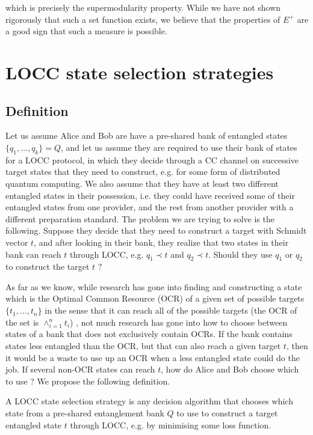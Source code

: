 \noindent which is precisely the supermodularity property. While we have not shown rigorously that such a set function exists, we believe that the properties of $E^+$ are a good sign that such a measure is possible.



\section{LOCC state selection strategies} \label{sec:strategies}

\subsection{Definition}

Let us assume Alice and Bob are have a pre-shared bank of entangled states $\{q_1, \dots, q_k\} = Q$, and let us assume they are required to use their bank of states for a LOCC protocol, in which they decide through a CC channel on successive target states that they need to construct, e.g. for some form of distributed quantum computing. We also assume that they have at least two different entangled states in their possession, i.e. they could have received some of their entangled states from one provider, and the rest from another provider with a different preparation standard. The problem we are trying to solve is the following. Suppose they decide that they need to construct a target with Schmidt vector $t$, and after looking in their bank, they realize that two states in their bank can reach $t$ through LOCC, e.g. $q_1 \prec t$ and $q_2 \prec t$. Should they use $q_1$ or $q_2$ to construct the target $t$ ?

As far as we know, while research has gone into finding and constructing a state which is the Optimal Common Resource (OCR) of a given set of possible targets $\{t_1, \dots, t_n\}$ in the sense that it can reach all of the possible targets (the OCR of the set is $\wedge_{i=1}^n t_i$) \cite{bosyk_optimal_2019, deside_probabilistic_2024}, not much research has gone into how to choose between states of a bank that does not exclusively contain OCRs. If the bank contains states less entangled than the OCR, but that can also reach a given target $t$, then it would be a waste to use up an OCR when a less entangled state could do the job. If several non-OCR states can reach $t$, how do Alice and Bob choose which to use ? We propose the following definition.

\begin{definition}
    A LOCC state selection strategy is any decision algorithm that chooses which state from a pre-shared entanglement bank $Q$ to use to construct a target entangled state $t$ through LOCC, e.g. by minimising some loss function.
\end{definition}

